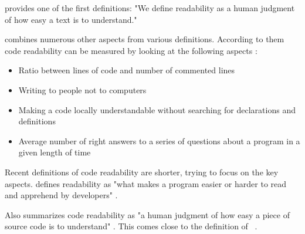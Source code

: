 \documentclass[%
class=scrreprt,
chapterprefix=false,%
open=right,%
twoside=false,%
paper=a4,%
logofile={Logo\_zentral\_farbig\_EN.png},%
thesistype=master,%
UKenglish,%
]{se2thesis}
\theoremstyle{definition}
\begin{document}
	
	\citeauthor{buse2009learning} provides one of the first definitions: "We define readability as a human judgment of how easy a
	text is to understand."

	\citeauthor{tashtoush2013impact} combines numerous other aspects from various definitions. According to them code readability can be measured by looking at the following aspects \cite{tashtoush2013impact}:
	\begin{itemize}
		\item Ratio between lines of code and number of commented lines
		\item Writing to people not to computers
		\item Making a code locally understandable without searching for declarations and definitions
		\item Average number of right answers to a series of questions about a program in a given length of time
	\end{itemize}
	
	Recent definitions of code readability are shorter, trying to focus on the key aspects. \citeauthor{oliveira2020evaluating} defines readability as "what makes a program easier or harder to read and apprehend by developers" \cite{oliveira2020evaluating}.
			
	Also \citeauthor{mi2021effectiveness} summarizes code readability as "a human judgment of how easy a piece of
	source code is to understand" \cite{mi2021effectiveness}. This comes close to the definition of \citeauthor{buse2009learning}~\cite{buse2009learning}.
	
\end{document}
